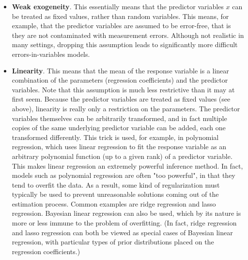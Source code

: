 \begin{itemize}
  \item \textbf{Weak exogeneity}.  This essentially means that the predictor variables $x$ can be treated as fixed values, rather than random variables.  This means, for example, that the predictor variables are assumed to be error-free, that is they are not contaminated with measurement errors. Although not realistic in many settings, dropping this assumption leads to significantly more difficult errors-in-variables models.

  \item \textbf{Linearity}.  This means that the mean of the response variable is a linear combination of the parameters (regression coefficients) and the predictor variables.  Note that this assumption is much less restrictive than it may at first seem.  Because the predictor variables are treated as fixed values (see above), linearity is really only a restriction on the parameters.  The predictor variables themselves can be arbitrarily transformed, and in fact multiple copies of the same underlying predictor variable can be added, each one transformed differently.  This trick is used, for example, in polynomial regression, which uses linear regression to fit the response variable as an arbitrary polynomial function (up to a given rank) of a predictor variable. This makes linear regression an extremely powerful inference method.  In fact, models such as polynomial regression are often "too powerful", in that they tend to overfit the data.  As a result, some kind of regularization must typically be used to prevent unreasonable solutions coming out of the estimation process.  Common examples are ridge regression and lasso regression.  Bayesian linear regression can also be used, which by its nature is more or less immune to the problem of overfitting. (In fact, ridge regression and lasso regression can both be viewed as special cases of Bayesian linear regression, with particular types of prior distributions placed on the regression coefficients.)


\end{itemize}
